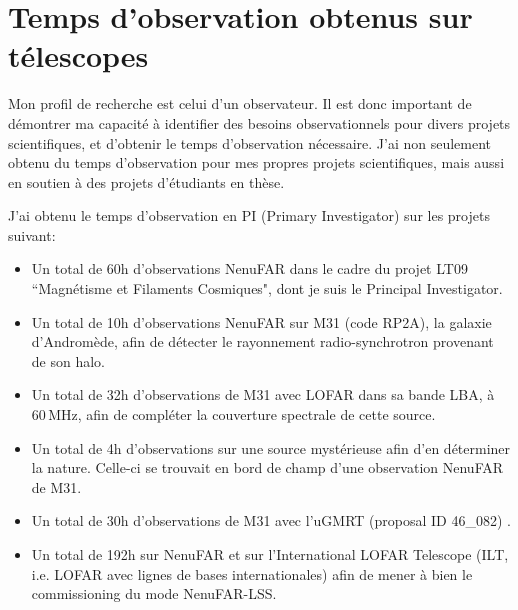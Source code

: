 


\chapter{Temps d'observation obtenus sur t\'elescopes} 

\pg
Mon profil de recherche est celui d'un observateur. Il est donc important de d\'emontrer ma capacit\'e \`a identifier des besoins observationnels pour divers projets scientifiques, et d'obtenir le temps d'observation n\'ecessaire. J'ai non seulement obtenu du temps d'observation pour mes propres projets scientifiques, mais aussi en soutien \`a des projets d'\'etudiants en th\`ese.

\pg
J'ai obtenu le temps d'observation en PI (Primary Investigator) sur les projets suivant:
\begin{itemize}
	\item Un total de 60h d'observations NenuFAR dans le cadre du projet LT09 ``Magn\'etisme et Filaments Cosmiques", dont je suis le Principal Investigator.
	\item Un total de 10h d'observations NenuFAR sur M31 (code RP2A), la galaxie d'Androm\`ede, afin de d\'etecter le rayonnement radio-synchrotron provenant de son halo.
	\item Un total de 32h d'observations de M31 avec LOFAR dans sa bande LBA, \`a 60\,MHz, afin de compl\'eter la couverture spectrale de cette source.
	\item Un total de 4h d'observations sur une source myst\'erieuse afin d'en d\'eterminer la nature. Celle-ci se trouvait en bord de champ d'une observation NenuFAR de M31.
	\item Un total de 30h d'observations de M31 avec l'uGMRT (proposal ID 46\_082) .
	\item Un total de 192h sur NenuFAR et sur l'International LOFAR Telescope (ILT, i.e. LOFAR avec lignes de bases internationales) afin de mener \`a bien le commissioning du mode NenuFAR-LSS.
\end{itemize}

